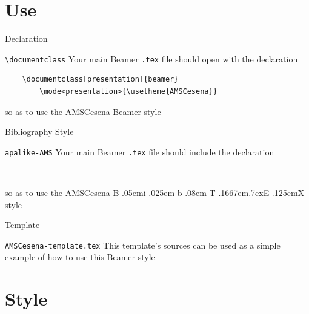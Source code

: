 \documentclass[presentation,cesena,apice]{beamer}\mode<presentation>{\usetheme{AMSCesena}}
\def\BibTeX{{\rm B\kern-.05em{\sc i\kern-.025em b}\kern-.08em
    T\kern-.1667em\lower.7ex\hbox{E}\kern-.125emX}}
\begin{document}
\section{Use}

\begin{frame}[c,fragile]{Declaration}
%
\begin{block}{\texttt{\textbackslash{}documentclass}}
Your main Beamer \texttt{.tex} file should open with the declaration
%
\begin{verbatim}
    \documentclass[presentation]{beamer}
        \mode<presentation>{\usetheme{AMSCesena}}
\end{verbatim}
%
so as to use the AMSCesena Beamer style
\end{block}
%
\end{frame}

\begin{frame}[c,fragile]{Bibliography Style}
%
\begin{block}{\texttt{apalike-AMS}}
Your main Beamer \texttt{.tex} file should include the declaration
\begin{verbatim}
    
\end{verbatim}
so as to use the AMSCesena \BibTeX{} style
\end{block}
%
\end{frame}

\begin{frame}[c,fragile]{Template}
%
\begin{block}{\texttt{AMSCesena-template.tex}}
This template's sources can be used as a simple example of how to use this Beamer style
\end{block}
%
\end{frame}


\section{Style}
\end{document}
